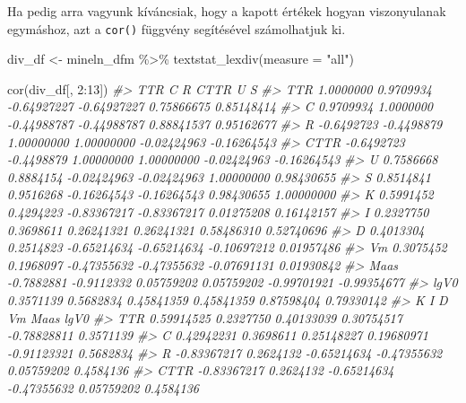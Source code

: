 \documentclass[
]{book}
\newenvironment{Shaded}{\begin{snugshade}}{\end{snugshade}}
\newcommand{\AttributeTok}[1]{\textcolor[rgb]{0.77,0.63,0.00}{#1}}
\newcommand{\CommentTok}[1]{\textcolor[rgb]{0.56,0.35,0.01}{\textit{#1}}}
\newcommand{\DecValTok}[1]{\textcolor[rgb]{0.00,0.00,0.81}{#1}}
\newcommand{\FunctionTok}[1]{\textcolor[rgb]{0.00,0.00,0.00}{#1}}
\newcommand{\NormalTok}[1]{#1}
\newcommand{\OtherTok}[1]{\textcolor[rgb]{0.56,0.35,0.01}{#1}}
\newcommand{\SpecialCharTok}[1]{\textcolor[rgb]{0.00,0.00,0.00}{#1}}
\newcommand{\StringTok}[1]{\textcolor[rgb]{0.31,0.60,0.02}{#1}}
\begin{document}
Ha pedig arra vagyunk kíváncsiak, hogy a kapott értékek hogyan
viszonyulanak egymáshoz, azt a \texttt{cor()} függvény segítésével
számolhatjuk ki.

\begin{Shaded}
\begin{Highlighting}[]
\NormalTok{div\_df }\OtherTok{\textless{}{-}}\NormalTok{ mineln\_dfm }\SpecialCharTok{\%\textgreater{}\%}
  \FunctionTok{textstat\_lexdiv}\NormalTok{(}\AttributeTok{measure =} \StringTok{"all"}\NormalTok{)}


\FunctionTok{cor}\NormalTok{(div\_df[, }\DecValTok{2}\SpecialCharTok{:}\DecValTok{13}\NormalTok{])}
\CommentTok{\#\textgreater{}             TTR          C           R        CTTR           U           S}
\CommentTok{\#\textgreater{} TTR   1.0000000  0.9709934 {-}0.64927227 {-}0.64927227  0.75866675  0.85148414}
\CommentTok{\#\textgreater{} C     0.9709934  1.0000000 {-}0.44988787 {-}0.44988787  0.88841537  0.95162677}
\CommentTok{\#\textgreater{} R    {-}0.6492723 {-}0.4498879  1.00000000  1.00000000 {-}0.02424963 {-}0.16264543}
\CommentTok{\#\textgreater{} CTTR {-}0.6492723 {-}0.4498879  1.00000000  1.00000000 {-}0.02424963 {-}0.16264543}
\CommentTok{\#\textgreater{} U     0.7586668  0.8884154 {-}0.02424963 {-}0.02424963  1.00000000  0.98430655}
\CommentTok{\#\textgreater{} S     0.8514841  0.9516268 {-}0.16264543 {-}0.16264543  0.98430655  1.00000000}
\CommentTok{\#\textgreater{} K     0.5991452  0.4294223 {-}0.83367217 {-}0.83367217  0.01275208  0.16142157}
\CommentTok{\#\textgreater{} I     0.2327750  0.3698611  0.26241321  0.26241321  0.58486310  0.52740696}
\CommentTok{\#\textgreater{} D     0.4013304  0.2514823 {-}0.65214634 {-}0.65214634 {-}0.10697212  0.01957486}
\CommentTok{\#\textgreater{} Vm    0.3075452  0.1968097 {-}0.47355632 {-}0.47355632 {-}0.07691131  0.01930842}
\CommentTok{\#\textgreater{} Maas {-}0.7882881 {-}0.9112332  0.05759202  0.05759202 {-}0.99701921 {-}0.99354677}
\CommentTok{\#\textgreater{} lgV0  0.3571139  0.5682834  0.45841359  0.45841359  0.87598404  0.79330142}
\CommentTok{\#\textgreater{}                K          I           D          Vm        Maas       lgV0}
\CommentTok{\#\textgreater{} TTR   0.59914525  0.2327750  0.40133039  0.30754517 {-}0.78828811  0.3571139}
\CommentTok{\#\textgreater{} C     0.42942231  0.3698611  0.25148227  0.19680971 {-}0.91123321  0.5682834}
\CommentTok{\#\textgreater{} R    {-}0.83367217  0.2624132 {-}0.65214634 {-}0.47355632  0.05759202  0.4584136}
\CommentTok{\#\textgreater{} CTTR {-}0.83367217  0.2624132 {-}0.65214634 {-}0.47355632  0.05759202  0.4584136}

\end{Highlighting}
\end{Shaded}
\end{document}
